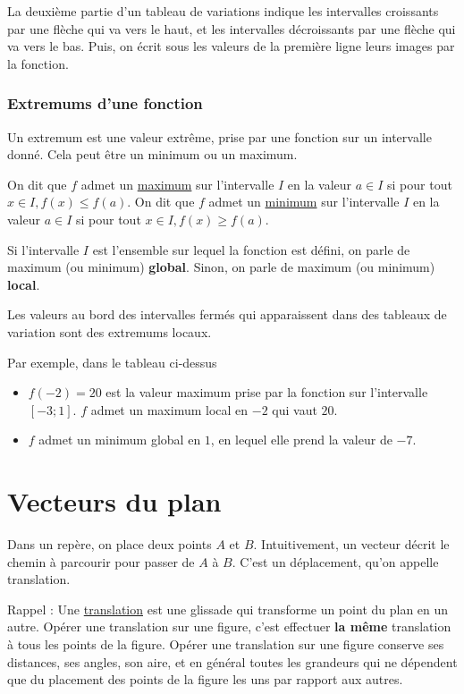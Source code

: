 \documentclass[10pt,a4paper,oneside]{book}
\begin{document}
La deuxième partie d'un tableau de variations indique les intervalles croissants par une flèche qui va vers le haut, et les intervalles décroissants par une flèche qui va vers le bas. Puis, on écrit sous les valeurs de la première ligne leurs images par la fonction.

\subsection{Extremums d'une fonction}

Un extremum est une valeur extrême, prise par une fonction sur un intervalle donné. Cela peut être un minimum ou un maximum.

\begin{de}
    On dit que $f$ admet un \underline{maximum} sur l'intervalle $I$ en la valeur $a \in I$ si pour tout $x \in I,  f(x)\leq f(a)$.
    On dit que $f$ admet un \underline{minimum} sur l'intervalle $I$ en la valeur $a \in I$ si pour tout $x \in I, f(x) \geq f(a)$. 
\end{de}

Si l'intervalle $I$ est l'ensemble sur lequel la fonction est défini, on parle de maximum (ou minimum) \textbf{global}. Sinon, on parle de maximum (ou minimum) \textbf{local}.

Les valeurs au bord des intervalles fermés qui apparaissent dans des tableaux de variation sont des extremums locaux.

Par exemple, dans le tableau ci-dessus\begin{itemize}
    \item 
$f(-2)=20$ est la valeur maximum prise par la fonction sur l'intervalle $[-3;1]$. $f$ admet un maximum local en $-2$ qui vaut $20$. 
\item $f$ admet un minimum global en $1$, en lequel elle prend la valeur de $-7$.
\end{itemize} 

\chapter{Vecteurs du plan}

Dans un repère, on place deux points $A$ et $B$. Intuitivement, un vecteur décrit le chemin à parcourir pour passer de $A$ à $B$. C'est un déplacement, qu'on appelle translation.

\begin{de}[Translation]
  Rappel : Une \underline{translation} est une glissade qui transforme un point du plan en un autre. Opérer une translation sur une figure, c'est effectuer \textbf{la même} translation à tous les points de la figure.
  Opérer une translation sur une figure conserve ses distances, ses angles, son aire, et en général toutes les grandeurs qui ne dépendent que du placement des points de la figure les uns par rapport aux autres. 
\end{de}
\end{document}
